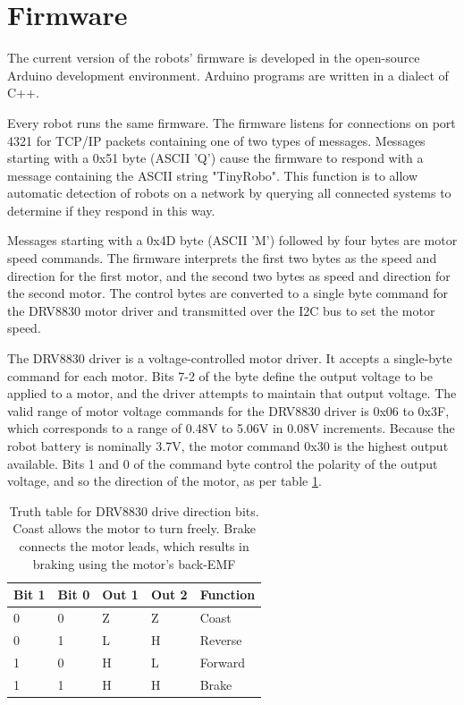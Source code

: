 \documentclass[]{article}
\begin{document}
\section {Firmware}

The current version of the robots' firmware is developed in the open-source Arduino development environment.
Arduino programs are written in a dialect of C++. 

Every robot runs the same firmware. 
The firmware listens for connections on port 4321 for TCP/IP packets containing one of two types of messages. 
Messages starting with a 0x51 byte (ASCII 'Q') cause the firmware to respond with a message containing the ASCII string "TinyRobo". 
This function is to allow automatic detection of robots on a network by querying all connected systems to determine if they respond in this way. 

Messages starting with a 0x4D byte (ASCII 'M') followed by four bytes are motor speed commands.
The firmware interprets the first two bytes as the speed and direction for the first motor, and the second two bytes as speed and direction for the second motor.
The control bytes are converted to a single byte command for the DRV8830 motor driver and transmitted over the I2C bus to set the motor speed.
 
The DRV8830 driver is a voltage-controlled motor driver. 
It accepts a single-byte command for each motor. 
Bits 7-2 of the byte define the output voltage to be applied to a motor, and the driver attempts to maintain that output voltage.
The valid range of motor voltage commands for the DRV8830 driver is 0x06 to 0x3F, which corresponds to a range of 0.48V to 5.06V in 0.08V increments. 
Because the robot battery is nominally 3.7V, the motor command 0x30 is the highest output available. 
Bits 1 and 0 of the command byte control the polarity of the output voltage, and so the direction of the motor, as per table \ref{tab:DRV8830_truth}.

\begin{table}
	\begin{tabular}{l l l l l}
	Bit 1 & Bit 0 & Out 1 & Out 2 & Function\\
	\hline
	0 & 0 & Z & Z & Coast\\
	0 & 1 & L & H & Reverse\\
	1 & 0 & H & L & Forward\\
	1 & 1 & H & H & Brake\\				
	\end{tabular}
	
	\caption{Truth table for DRV8830 drive direction bits. Coast allows the motor to turn freely. Brake connects the motor leads, which results in braking using the motor's back-EMF}
	\label{tab:DRV8830_truth}
\end{table}
\end{document}
